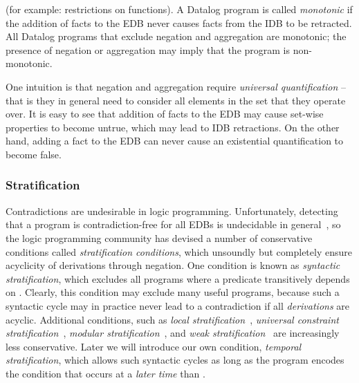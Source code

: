 (for example: restrictions
on functions).  A Datalog program is called {\em monotonic} if the addition of
facts to the EDB never causes facts from the IDB to be retracted.  All Datalog
programs that exclude negation and aggregation are monotonic; the presence of
negation or aggregation may imply that the program is non-monotonic.

One intuition is that negation and aggregation require {\em universal
quantification} -- that is they in general need to consider all elements in the
set that they operate over.  It is easy to see that addition of facts to the
EDB may cause set-wise properties to become untrue, which may lead to IDB
retractions.  On the other hand, adding a fact to the EDB can never cause an
existential quantification to become false.

\subsubsection{Stratification}

Contradictions are undesirable in logic programming. 
Unfortunately, detecting that a program is contradiction-free for all EDBs is
undecidable in general~\cite{papa-yanna}, so the logic programming community
has devised a number of conservative conditions called {\em stratification
conditions}, which unsoundly but completely ensure acyclicity of derivations
through negation.  One condition is known as {\em syntactic stratification},
which excludes all programs where a predicate  transitively depends
on .  Clearly, this condition may exclude many useful
programs, because such a syntactic cycle may in practice never lead to a
contradiction if all {\em derivations} are acyclic.  Additional conditions,
such as {\em local stratification}~\cite{local-strat}, {\em universal
constraint stratification}~\cite{ross-syntactic}, {\em modular
stratification}~\cite{modular}, and {\em weak stratification}~\cite{weak-strat}
are increasingly less conservative.  Later we will introduce our own condition,
{\em temporal stratification}, which allows such syntactic cycles as long as
the program encodes the condition that  occurs at a {\em later time}
than .

